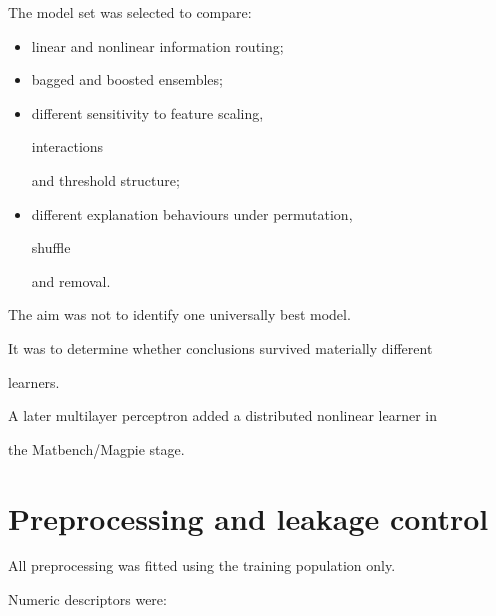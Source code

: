 \documentclass[11pt,a4paper,oneside]{report}
\begin{document}
The model set was selected to compare:



\begin{itemize}



\item

linear and nonlinear information routing;



\item

bagged and boosted ensembles;



\item

different sensitivity to feature scaling,

interactions

and threshold structure;



\item

different explanation behaviours under permutation,

shuffle

and removal.



\end{itemize}



The aim was not to identify one universally best model.



It was to determine whether conclusions survived materially different

learners.



A later multilayer perceptron added a distributed nonlinear learner in

the Matbench/Magpie stage.





\section{Preprocessing and leakage control}



All preprocessing was fitted using the training population only.



Numeric descriptors were:
\end{document}
